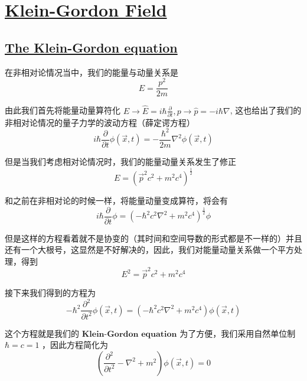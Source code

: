 \chapter{\protect\hyperlink{:}{Klein-Gordon Field}}

\section{\protect\hyperlink{:}{The Klein-Gordon equation}}

在非相对论情况当中，我们的能量与动量关系是 
\begin{equation*}
    E = \frac{p^2}{2m}
\end{equation*}

由此我们首先将能量动量算符化 $\displaystyle E\to\hat{E} = i\hbar\frac{\partial}{\partial t},p\to\hat{p} = -i\hbar\nabla$, 这也给出了我们的非相对论情况的量子力学的波动方程（薛定谔方程）
\begin{equation*}
    i\hbar\frac{\partial}{\partial t} \phi(\vec{x},t) = -\frac{\hbar^2}{2m} \nabla^2 \phi(\vec{x},t)
\end{equation*}

但是当我们考虑相对论情况时，我们的能量动量关系发生了修正
\begin{equation*}
    E = \left(\vec{p}^2c^2 + m^2 c^4\right)^{\frac{1}{2}}
\end{equation*}

和之前在非相对论的时候一样，将能量动量变成算符，将会有
\begin{equation*}
    i\hbar \frac{\partial}{\partial t}\phi = \left(-\hbar^2c^2\nabla^2 + m^2 c^4\right)^{\frac{1}{2}} \phi
\end{equation*}

但是这样的方程看着就不是协变的（其时间和空间导数的形式都是不一样的）并且还有一个大根号，这显然是不好解决的，因此，我们对能量动量关系做一个平方处理，得到 
\begin{equation*}
    E^2 = \vec{p}^2c^2 + m^2c^4
\end{equation*}

接下来我们得到的方程为
\begin{equation*}
    -\hbar^2\frac{\partial^2}{\partial t^2} \phi(\vec{x},t) = \left(-\hbar^2c^2\nabla^2 + m^2 c^4 \right)\phi(\vec{x},t)
\end{equation*}

这个方程就是我们的 $\textbf{Klein-Gordon equation}$ 为了方便，我们采用自然单位制 $\hbar = c = 1$ ，因此方程简化为
\begin{equation*}
    \left(\frac{\partial^2}{\partial t^2} - \nabla^2 +m^2\right)\phi(\vec{x},t) = 0
\end{equation*}

